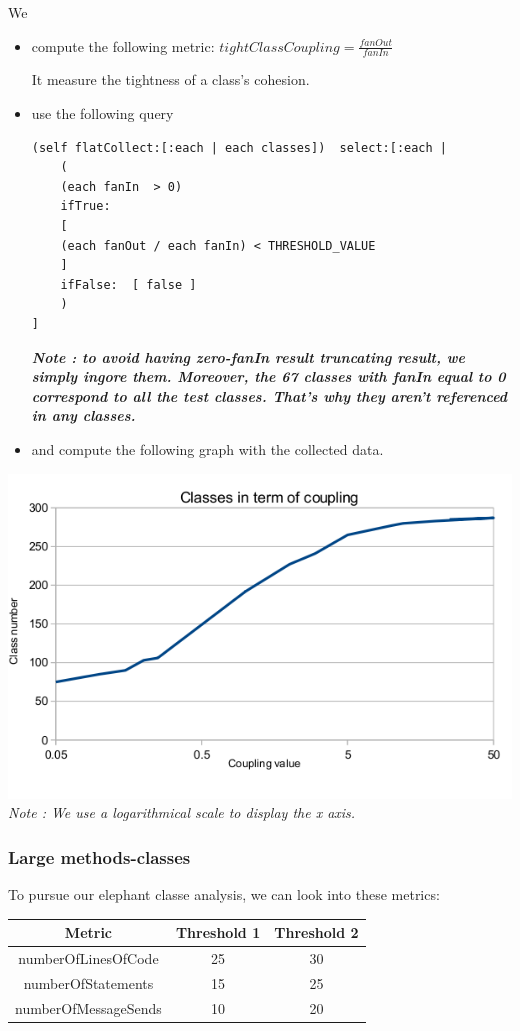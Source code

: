 \documentclass[11pt,a4paper]{article}
\begin{document}
We 
\begin{itemize}

\item compute the following metric:
$tightClassCoupling = \frac{fanOut}{fanIn}$

It measure the tightness of a class's cohesion.
\item use the following query
\begin{lstlisting}
(self flatCollect:[:each | each classes])  select:[:each | 
	(
	(each fanIn  > 0)  
	ifTrue: 
	[
	(each fanOut / each fanIn) < THRESHOLD_VALUE
	]
	ifFalse:  [ false ]
	)
]
\end{lstlisting}
\textbf{\textit{Note : to avoid having zero-fanIn result truncating result, we simply ingore them. Moreover, the 67 classes with fanIn equal to 0 correspond to all the test classes. That's why they aren't referenced in any classes.}}
\item{and compute the following graph with the collected data.}
\end{itemize}
\includegraphics[width=\textwidth]{coupling_result}
\textit{Note : We use a logarithmical scale to display the x axis.}
\subsubsection{Large methods-classes}
To pursue our elephant classe analysis, we can look into these metrics:\\
\begin{tabular}{| c | c | c |}
\hline
Metric & Threshold 1 & Threshold 2\\
\hline
numberOfLinesOfCode & 25 & 30\\
\hline
numberOfStatements & 15 & 25\\
\hline
numberOfMessageSends & 10 & 20\\
\hline
\end{tabular}\\
\end{document}
